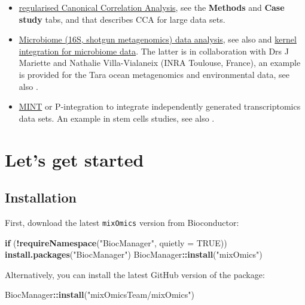 \documentclass[]{book}
\newenvironment{Shaded}{\begin{snugshade}}{\end{snugshade}}
\newcommand{\ControlFlowTok}[1]{\textcolor[rgb]{0.13,0.29,0.53}{\textbf{#1}}}
\newcommand{\DataTypeTok}[1]{\textcolor[rgb]{0.13,0.29,0.53}{#1}}
\newcommand{\KeywordTok}[1]{\textcolor[rgb]{0.13,0.29,0.53}{\textbf{#1}}}
\newcommand{\NormalTok}[1]{#1}
\newcommand{\OperatorTok}[1]{\textcolor[rgb]{0.81,0.36,0.00}{\textbf{#1}}}
\newcommand{\OtherTok}[1]{\textcolor[rgb]{0.56,0.35,0.01}{#1}}
\newcommand{\StringTok}[1]{\textcolor[rgb]{0.31,0.60,0.02}{#1}}
\begin{document}
\begin{itemize}
\item
  \href{http://www.mixOmics.org}{regularised Canonical Correlation Analysis}, see the \textbf{Methods} and \textbf{Case study} tabs, and \citep{Gon08} that describes CCA for large data sets.
\item
  \href{http://www.mixOmics.org/mixmc}{Microbiome (16S, shotgun metagenomics) data analysis}, see also \citep{Lec16} and \href{http://mixomics.org/mixkernel}{kernel integration for microbiome data}. The latter is in collaboration with Drs J Mariette and Nathalie Villa-Vialaneix (INRA Toulouse, France), an example is provided for the Tara ocean metagenomics and environmental data, see also \citep{Mar17}.
\item
  \href{http://mixomics.org/mixmint/}{MINT} or P-integration to integrate independently generated transcriptomics data sets. An example in stem cells studies, see also \citep{Roh16}.
\end{itemize}

\hypertarget{start}{%
\chapter{Let's get started}\label{start}}

\hypertarget{installation}{%
\section{Installation}\label{installation}}

First, download the latest \texttt{mixOmics} version from Bioconductor:

\begin{Shaded}
\begin{Highlighting}[]
\ControlFlowTok{if}\NormalTok{ (}\OperatorTok{!}\KeywordTok{requireNamespace}\NormalTok{(}\StringTok{"BiocManager"}\NormalTok{, }\DataTypeTok{quietly =} \OtherTok{TRUE}\NormalTok{))}
    \KeywordTok{install.packages}\NormalTok{(}\StringTok{"BiocManager"}\NormalTok{)}
\NormalTok{ BiocManager}\OperatorTok{::}\KeywordTok{install}\NormalTok{(}\StringTok{"mixOmics"}\NormalTok{)}
\end{Highlighting}
\end{Shaded}

Alternatively, you can install the latest GitHub version of the package:

\begin{Shaded}
\begin{Highlighting}[]
\NormalTok{BiocManager}\OperatorTok{::}\KeywordTok{install}\NormalTok{(}\StringTok{"mixOmicsTeam/mixOmics"}\NormalTok{)}
\end{Highlighting}
\end{Shaded}
\end{document}
